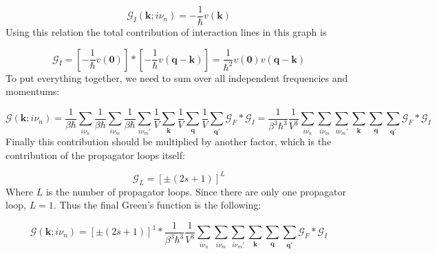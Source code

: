 \begin{equation} \label{eq:14}
\mathcal{G}_{I} \left( \boldsymbol{k}; i \nu_{n} \right)
=
- \frac{1}{\hbar} v \left( \boldsymbol{k} \right)
\end{equation}
Using this relation the total contribution of interaction lines in this graph is

\begin{equation} \label{eq:15}
\mathcal{G}_{I}
=
\left[ - \frac{1}{\hbar} v \left( \boldsymbol{0} \right) \right]
*
\left[ - \frac{1}{\hbar} v \left( \boldsymbol{q} - \boldsymbol{k} \right) \right]
=
\frac{1}{\hbar^{2}} v \left( \boldsymbol{0} \right) v \left( \boldsymbol{q} - \boldsymbol{k} \right)
\end{equation}
To put everything together, we need to sum over all independent frequencies and momentums:

\begin{equation} \label{eq:16}
\mathcal{G} \left( \boldsymbol{k}; i \nu_{n} \right)
=
\frac{1}{\beta \hbar} \sum_{i \nu_{n}}
\frac{1}{\beta \hbar} \sum_{i \nu_{m}}
\frac{1}{\beta \hbar} \sum_{i \nu_{m}'}
\frac{1}{V} \sum_{\boldsymbol{k}}
\frac{1}{V} \sum_{\boldsymbol{q}}
\frac{1}{V} \sum_{\boldsymbol{q}'}
\mathcal{G}_{F} * \mathcal{G}_{I}
=
\frac{1}{\beta^{3} \hbar^{3}} \frac{1}{V^{3}}
\sum_{i \nu_{n}}
\sum_{i \nu_{m}}
\sum_{i \nu_{m}'}
\sum_{\boldsymbol{k}}
\sum_{\boldsymbol{q}}
\sum_{\boldsymbol{q}'}
\mathcal{G}_{F} * \mathcal{G}_{I}
\end{equation}
Finally this contribution should be multiplied by another factor, which is the contribution of the propagator loops itself:

\begin{equation} \label{eq:17}
\mathcal{G}_{L}
=
\left[ \pm \left( 2s + 1 \right) \right]^{L}
\end{equation}
Where $L$ is the number of propagator loops. Since there are only one propagator loop, $L = 1$. Thus the final Green's function is the following:

\begin{equation} \label{eq:18}
\mathcal{G} \left( \boldsymbol{k}; i \nu_{n} \right)
=
\left[ \pm \left( 2s + 1 \right) \right]^{1} *
\frac{1}{\beta^{3} \hbar^{3}} \frac{1}{V^{3}}
\sum_{i \nu_{n}}
\sum_{i \nu_{m}}
\sum_{i \nu_{m}'}
\sum_{\boldsymbol{k}}
\sum_{\boldsymbol{q}}
\sum_{\boldsymbol{q}'}
\mathcal{G}_{F} * \mathcal{G}_{I}
\end{equation}